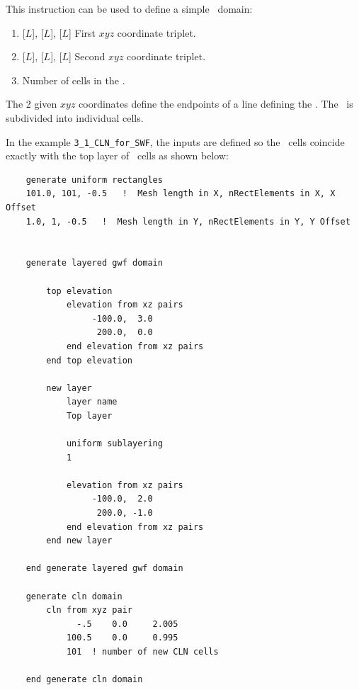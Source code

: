 This instruction can be used to define a simple \cln\ domain:

    {
        \squish
        \begin{enumerate}
        \item {} [$L$],  [$L$],  [$L$]  First $xyz$ coordinate triplet.
        \item {} [$L$],  [$L$],  [$L$]  Second $xyz$ coordinate triplet.
        \item {}  Number of cells in the \cln.
        \end{enumerate}
        The 2 given $xyz$ coordinates define the endpoints of a line defining the \cln.  The \cln\ is subdivided into  individual cells.
    }

In the example \texttt{3\_1\_CLN\_for\_SWF}, the inputs are defined so the \cln\ cells coincide exactly with the top layer of \gwf\ cells as shown below:
\begin{verbatim}
    generate uniform rectangles
    101.0, 101, -0.5   !  Mesh length in X, nRectElements in X, X Offset
    1.0, 1, -0.5   !  Mesh length in Y, nRectElements in Y, Y Offset


    generate layered gwf domain

        top elevation
            elevation from xz pairs
                 -100.0,  3.0
                  200.0,  0.0
            end elevation from xz pairs
        end top elevation

        new layer
            layer name
            Top layer

            uniform sublayering
            1

            elevation from xz pairs
                 -100.0,  2.0
                  200.0, -1.0
            end elevation from xz pairs
        end new layer

    end generate layered gwf domain

    generate cln domain
        cln from xyz pair
              -.5    0.0     2.005
            100.5    0.0     0.995
            101  ! number of new CLN cells

    end generate cln domain

\end{verbatim}

